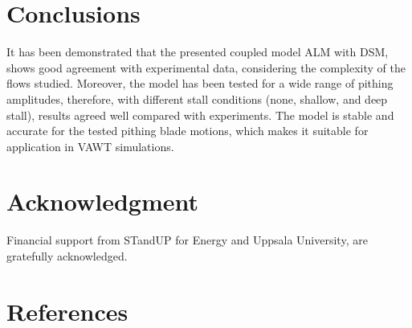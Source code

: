 \documentclass[a4paper]{jpconf}
\begin{document}
\section{Conclusions}

It has been demonstrated that the presented coupled model ALM with DSM, shows
good agreement with experimental data, considering the complexity of the flows
studied. Moreover, the model has been tested for a wide range of pithing
amplitudes, therefore, with different stall conditions (none, shallow, and deep
stall), results agreed well compared with experiments. The model is stable and
accurate for the tested pithing blade motions, which makes it suitable for
application in VAWT simulations.


\section*{Acknowledgment}
Financial support from STandUP for Energy and Uppsala University, are gratefully acknowledged.


\section*{References}

{}

\end{document}
